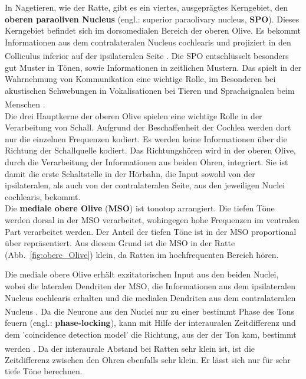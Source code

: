 In Nagetieren, wie der Ratte, gibt es ein viertes, ausgeprägtes Kerngebiet, den \textbf{oberen paraoliven Nucleus} (engl.: superior paraolivary nucleus, \textbf{SPO}). Dieses Kerngebiet befindet sich im dorsomedialen Bereich der oberen Olive. Es bekommt Informationen aus dem contralateralen Nucleus cochlearis und projiziert in den Colliculus inferior auf der ipsilateralen Seite \textsuperscript{\cite[Kap.~29]{paxinos2014rat}}. Die SPO entschlüsselt besonders gut Muster in Tönen, sowie Informationen in zeitlichen Mustern. Das spielt in der Wahrnehmung von Kommunikation eine wichtige Rolle, im Besonderen bei akustischen Schwebungen in Vokalisationen bei Tieren und Sprachsignalen beim Menschen \textsuperscript{\cite[Kap.~29]{paxinos2014rat}}. 
\\

\noindent Die drei Hauptkerne der oberen Olive spielen eine wichtige Rolle in der Verarbeitung von Schall. Aufgrund der Beschaffenheit der Cochlea werden dort nur die einzelnen Frequenzen kodiert. Es werden keine Informationen über die Richtung der Schallquelle kodiert. Das Richtungshören wird in der oberen Olive, durch die Verarbeitung der Informationen aus beiden Ohren, integriert. Sie ist damit die erste Schaltstelle in der Hörbahn, die Input sowohl von der ipsilateralen, als auch von der contralateralen Seite, aus den jeweiligen Nuclei cochlearis, bekommt.
\\

\noindent Die \textbf{mediale obere Olive} (\textbf{MSO}) ist tonotop arrangiert. Die tiefen Töne werden dorsal in der MSO verarbeitet, wohingegen hohe Frequenzen im ventralen Part verarbeitet werden. Der Anteil der tiefen Töne ist in der MSO proportional über repräsentiert. Aus diesem Grund ist die MSO in der Ratte (Abb.~\ref{fig:obere_Olive}) klein, da Ratten im hochfrequenten Bereich hören.

Die mediale obere Olive erhält exzitatorischen Input aus den beiden Nuclei, wobei die lateralen Dendriten der MSO, die Informationen aus dem ipsilateralen Nucleus cochlearis erhalten und die medialen Dendriten aus dem contralateralen Nucleus \textsuperscript{\cite[Kap.~29]{paxinos2014rat}}. Da die Neurone aus den Nuclei nur zu einer bestimmt Phase des Tons feuern (engl.: \textbf{phase-locking}), kann mit Hilfe der interauralen Zeitdifferenz und dem 'coincidence detection model' die Richtung, aus der der Ton kam, bestimmt werden \textsuperscript{\cite[Kap.~31]{kandel2013principles}}. Da der interaurale Abstand bei Ratten sehr klein ist, ist die Zeitdifferenz zwischen den Ohren ebenfalls sehr klein. Er lässt sich nur für sehr tiefe Töne berechnen.

